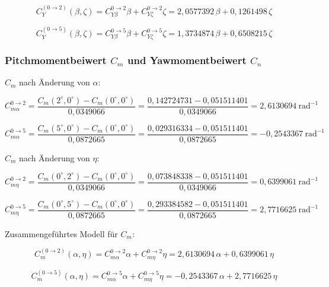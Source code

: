\begin{equation}
C_Y^{(0\to2)}(\beta,\zeta)
= C_{Y\beta}^{0\to2}\beta+ C_{Y\zeta}^{0\to2}\zeta
= 2{,}0577392\,\beta+ 0{,}1261498\,\zeta
\end{equation}

\begin{equation}
C_Y^{(0\to5)}(\beta,\zeta)
= C_{Y\beta}^{0\to5}\beta+ C_{Y\zeta}^{0\to5}\zeta
= 1{,}3734874\,\beta+ 0{,}6508215\,\zeta
\end{equation}

\subsubsection*{Pitchmomentbeiwert $C_m$ und Yawmomentbeiwert $C_n$}
$C_m$ nach Änderung von $\alpha$:

\begin{equation}
C_{m\alpha}^{0\to2}
= \frac{C_m(2^\circ,0^\circ)-C_m(0^\circ,0^\circ)}{0{,}0349066}
= \frac{0{,}142724731-0{,}051511401}{0{,}0349066}
= 2{,}6130694\ \mathrm{rad^{-1}}
\end{equation}

\begin{equation}
C_{m\alpha}^{0\to5}
= \frac{C_m(5^\circ,0^\circ)-C_m(0^\circ,0^\circ)}{0{,}0872665}
= \frac{0{,}029316334-0{,}051511401}{0{,}0872665}
= -0{,}2543367\ \mathrm{rad^{-1}}
\end{equation}

$C_m$ nach Änderung von $\eta$:

\begin{equation}
C_{m\eta}^{0\to2}
= \frac{C_m(0^\circ,2^\circ)-C_m(0^\circ,0^\circ)}{0{,}0349066}
= \frac{0{,}073848338-0{,}051511401}{0{,}0349066}
= 0{,}6399061\ \mathrm{rad^{-1}}
\end{equation}

\begin{equation}
C_{m\eta}^{0\to5}
= \frac{C_m(0^\circ,5^\circ)-C_m(0^\circ,0^\circ)}{0{,}0872665}
= \frac{0{,}293384582-0{,}051511401}{0{,}0872665}
= 2{,}7716625\ \mathrm{rad^{-1}}
\end{equation}

Zusammengeführtes Modell für $C_m$:

\begin{equation}
C_m^{(0\to2)}(\alpha,\eta)
= C_{m\alpha}^{0\to2}\alpha + C_{m\eta}^{0\to2}\eta
= 2{,}6130694\,\alpha + 0{,}6399061\,\eta
\end{equation}

\begin{equation}
C_m^{(0\to5)}(\alpha,\eta)
= C_{m\alpha}^{0\to5}\alpha + C_{m\eta}^{0\to5}\eta
= -0{,}2543367\,\alpha + 2{,}7716625\,\eta
\end{equation}

